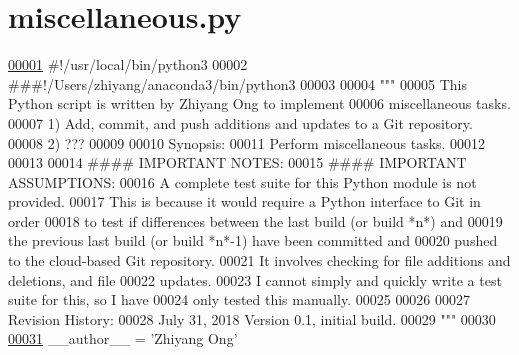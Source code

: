 \hypertarget{miscellaneous_8py_source}{}\section{miscellaneous.\+py}
\label{miscellaneous_8py_source}

\begin{DoxyCode}
\hypertarget{miscellaneous_8py_source_l00001}{}\hyperlink{namespaceutilities_1_1miscellaneous}{00001} \textcolor{comment}{#!/usr/local/bin/python3}
00002 \textcolor{comment}{###!/Users/zhiyang/anaconda3/bin/python3}
00003 
00004 \textcolor{stringliteral}{"""}
00005 \textcolor{stringliteral}{    This Python script is written by Zhiyang Ong to implement}
00006 \textcolor{stringliteral}{        miscellaneous tasks.}
00007 \textcolor{stringliteral}{    1) Add, commit, and push additions and updates to a Git repository.}
00008 \textcolor{stringliteral}{    2) ???}
00009 \textcolor{stringliteral}{}
00010 \textcolor{stringliteral}{    Synopsis:}
00011 \textcolor{stringliteral}{    Perform miscellaneous tasks.}
00012 \textcolor{stringliteral}{}
00013 \textcolor{stringliteral}{}
00014 \textcolor{stringliteral}{    #### IMPORTANT NOTES:}
00015 \textcolor{stringliteral}{    #### IMPORTANT ASSUMPTIONS:}
00016 \textcolor{stringliteral}{    A complete test suite for this Python module is not provided.}
00017 \textcolor{stringliteral}{    This is because it would require a Python interface to Git in order}
00018 \textcolor{stringliteral}{        to test if differences between the last build (or build *n*) and}
00019 \textcolor{stringliteral}{        the previous last build (or build *n*-1) have been committed and}
00020 \textcolor{stringliteral}{        pushed to the cloud-based Git repository.}
00021 \textcolor{stringliteral}{        It involves checking for file additions and deletions, and file}
00022 \textcolor{stringliteral}{            updates.}
00023 \textcolor{stringliteral}{    I cannot simply and quickly write a test suite for this, so I have}
00024 \textcolor{stringliteral}{        only tested this manually.}
00025 \textcolor{stringliteral}{}
00026 \textcolor{stringliteral}{}
00027 \textcolor{stringliteral}{    Revision History:}
00028 \textcolor{stringliteral}{    July 31, 2018           Version 0.1, initial build.}
00029 \textcolor{stringliteral}{"""}
00030 
\hypertarget{miscellaneous_8py_source_l00031}{}\hyperlink{namespaceutilities_1_1miscellaneous_a48adfde4ebd796df397b62ffacb0e3e3}{00031} \_\_author\_\_ = \textcolor{stringliteral}{'Zhiyang Ong'}

\end{DoxyCode}
